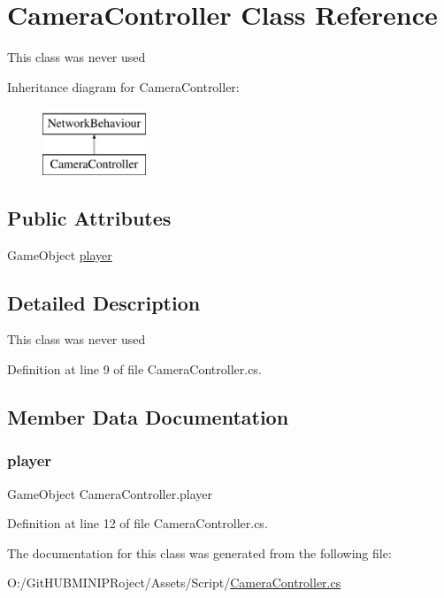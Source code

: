 \hypertarget{class_camera_controller}{}\section{Camera\+Controller Class Reference}
\label{class_camera_controller}


This class was never used  


Inheritance diagram for Camera\+Controller\+:\begin{figure}[H]
\begin{center}
\leavevmode
\includegraphics[height=2.000000cm]{class_camera_controller}
\end{center}
\end{figure}
\subsection*{Public Attributes}
\begin{DoxyCompactItemize}
\item 
Game\+Object \mbox{\hyperlink{class_camera_controller_aae794ec2d17947f671ce0eaef9aac8b7}{player}}
\end{DoxyCompactItemize}


\subsection{Detailed Description}
This class was never used 



Definition at line 9 of file Camera\+Controller.\+cs.



\subsection{Member Data Documentation}
\mbox{\label{class_camera_controller_aae794ec2d17947f671ce0eaef9aac8b7}} 
\subsubsection{\texorpdfstring{player}{player}}
{\footnotesize\ttfamily Game\+Object Camera\+Controller.\+player}



Definition at line 12 of file Camera\+Controller.\+cs.



The documentation for this class was generated from the following file\+:\begin{DoxyCompactItemize}
\item 
O\+:/\+Git\+H\+U\+B\+M\+I\+N\+I\+P\+Roject/\+Assets/\+Script/\mbox{\hyperlink{_camera_controller_8cs}{Camera\+Controller.\+cs}}\end{DoxyCompactItemize}

